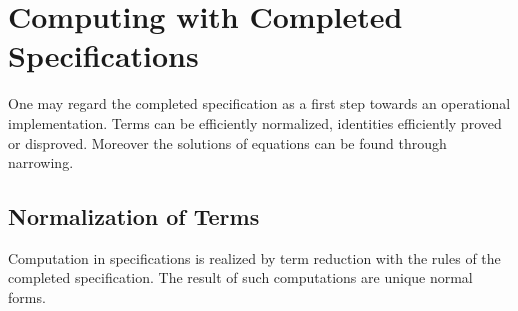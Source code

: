 \section{Computing with Completed Specifications}

One may regard the completed specification as a first step towards an operational
implementation. 
Terms can be efficiently normalized, identities efficiently proved or disproved.
Moreover the solutions of equations can be found through narrowing.

\subsection{Normalization of Terms}
\label{NormCommand}

Computation in specifications is realized by term reduction with the
rules of the completed specification. The result of such computations are unique
normal forms. \bigskip

